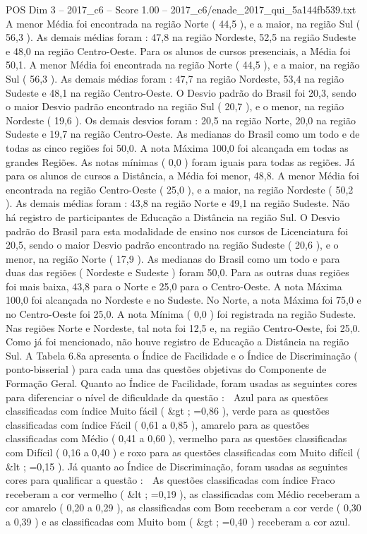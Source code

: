 \begin{textsample}{POS Dim 3 – 2017\_c6 – Score 1.00 – 2017\_c6/enade\_2017\_qui\_5a144fb539.txt}
A menor Média foi encontrada na região Norte ( 44,5 ), e a maior, na região Sul ( 56,3 ).
As demais médias foram : 47,8 na região Nordeste, 52,5 na região Sudeste e 48,0 na região Centro-Oeste.
Para os alunos de cursos presenciais, a Média foi 50,1.
A menor Média foi encontrada na região Norte ( 44,5 ), e a maior, na região Sul ( 56,3 ).
As demais médias foram : 47,7 na região Nordeste, 53,4 na região Sudeste e 48,1 na região Centro-Oeste.
O Desvio padrão do Brasil foi 20,3, sendo o maior Desvio padrão encontrado na região Sul ( 20,7 ), e o menor, na região Nordeste ( 19,6 ).
Os demais desvios foram : 20,5 na região Norte, 20,0 na região Sudeste e 19,7 na região Centro-Oeste.
As medianas do Brasil como um todo e de todas as cinco regiões foi 50,0.
A nota Máxima 100,0 foi alcançada em todas as grandes Regiões.
As notas mínimas ( 0,0 ) foram iguais para todas as regiões.
Já para os alunos de cursos a Distância, a Média foi menor, 48,8.
A menor Média foi encontrada na região Centro-Oeste ( 25,0 ), e a maior, na região Nordeste ( 50,2 ).
As demais médias foram : 43,8 na região Norte e 49,1 na região Sudeste.
Não há registro de participantes de Educação a Distância na região Sul.
O Desvio padrão do Brasil para esta modalidade de ensino nos cursos de Licenciatura foi 20,5, sendo o maior Desvio padrão encontrado na região Sudeste ( 20,6 ), e o menor, na região Norte ( 17,9 ).
As medianas do Brasil como um todo e para duas das regiões ( Nordeste e Sudeste ) foram 50,0.
Para as outras duas regiões foi mais baixa, 43,8 para o Norte e 25,0 para o Centro-Oeste.
A nota Máxima 100,0 foi alcançada no Nordeste e no Sudeste.
No Norte, a nota Máxima foi 75,0 e no Centro-Oeste foi 25,0.
A nota Mínima ( 0,0 ) foi registrada na região Sudeste.
Nas regiões Norte e Nordeste, tal nota foi 12,5 e, na região Centro-Oeste, foi 25,0.
Como já foi mencionado, não houve registro de Educação a Distância na região Sul.
A Tabela 6.8a apresenta o Índice de Facilidade e o Índice de Discriminação ( ponto-bisserial ) para cada uma das questões objetivas do Componente de Formação Geral.
Quanto ao Índice de Facilidade, foram usadas as seguintes cores para diferenciar o nível de dificuldade da questão :  Azul para as questões classificadas com índice Muito fácil ( \&gt ; =0,86 ), verde para as questões classificadas com índice Fácil ( 0,61 a 0,85 ), amarelo para as questões classificadas com Médio ( 0,41 a 0,60 ), vermelho para as questões classificadas com Difícil ( 0,16 a 0,40 ) e roxo para as questões classificadas com Muito difícil ( \&lt ; =0,15 ).
Já quanto ao Índice de Discriminação, foram usadas as seguintes cores para qualificar a questão :  As questões classificadas com índice Fraco receberam a cor vermelho ( \&lt ; =0,19 ), as classificadas com Médio receberam a cor amarelo ( 0,20 a 0,29 ), as classificadas com Bom receberam a cor verde ( 0,30 a 0,39 ) e as classificadas com Muito bom ( \&gt ; =0,40 ) receberam a cor azul.

\end{textsample}
